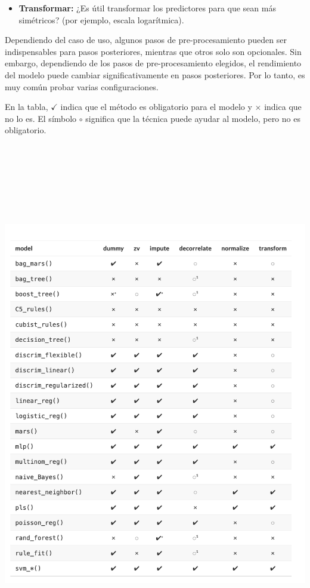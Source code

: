 \documentclass[
]{book}
\providecommand{\tightlist}{%
  \setlength{\itemsep}{0pt}\setlength{\parskip}{0pt}}
\begin{document}
\begin{itemize}
\tightlist
\item
  \textbf{Transformar:} ¿Es útil transformar los predictores para que sean más simétricos? (por ejemplo, escala logarítmica).
\end{itemize}

Dependiendo del caso de uso, algunos pasos de pre-procesamiento pueden ser indispensables para pasos posteriores, mientras que otros solo son opcionales. Sin embargo, dependiendo de los pasos de pre-procesamiento elegidos, el rendimiento del modelo puede cambiar significativamente en pasos posteriores. Por lo tanto, es muy común probar varias configuraciones.

En la tabla, \(\checkmark\) indica que el método es obligatorio para el modelo y \(\times\) indica que no lo es. El símbolo \(\circ\) significa que la técnica puede ayudar al modelo, pero no es obligatorio.

\begin{center}\includegraphics[width=600pt,height=650pt]{img/04-ml/3-2-1-preprocesamiento-modelos} \end{center}
\end{document}
